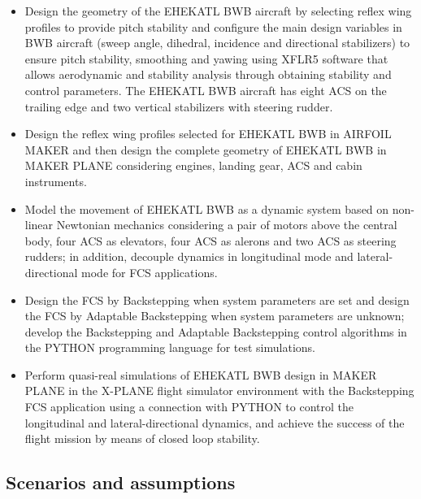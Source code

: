 \begin{itemize}
\item[O1] Design the geometry of the EHEKATL BWB aircraft by selecting reflex wing profiles to provide pitch stability and configure the main design variables in BWB aircraft (sweep angle, dihedral, incidence and directional stabilizers) to ensure pitch stability, smoothing and yawing using XFLR5 software that allows aerodynamic and stability analysis through obtaining stability and control parameters. The EHEKATL BWB aircraft has eight ACS on the trailing edge and two vertical stabilizers with steering rudder.  
\item[O2]  Design the reflex wing profiles selected for EHEKATL BWB in AIRFOIL MAKER and then design the complete geometry of EHEKATL BWB in MAKER PLANE considering engines, landing gear, ACS and cabin instruments. 
\item[O3] Model the movement of EHEKATL BWB as a dynamic system based on non-linear Newtonian mechanics considering a pair of motors above the central body, four ACS as elevators, four ACS as alerons and two ACS as steering rudders; in addition, decouple dynamics in longitudinal mode and lateral-directional mode for FCS applications. 
\item[O4] Design the FCS by Backstepping when system parameters are set and design the FCS by Adaptable Backstepping when system parameters are unknown; develop the Backstepping and Adaptable Backstepping control algorithms in the PYTHON programming language for test simulations. 
\item[O5] Perform quasi-real simulations of EHEKATL BWB design in MAKER PLANE in the X-PLANE flight simulator environment with the Backstepping FCS application using a connection with PYTHON to control the longitudinal and lateral-directional dynamics, and achieve the success of the flight mission by means of closed loop stability. 
\end{itemize}

\subsection{Scenarios and assumptions}

